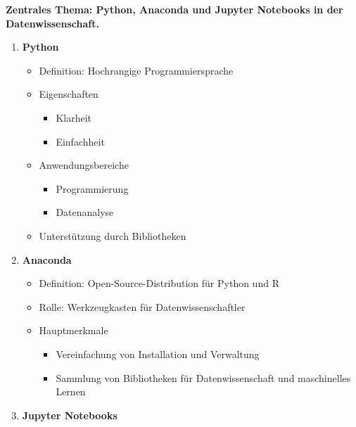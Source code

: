 \documentclass{vorlage-design-main}
\begin{document}
\textbf{Zentrales Thema: Python, Anaconda und Jupyter Notebooks in der
Datenwissenschaft.}

\begin{enumerate}
\def\labelenumi{\arabic{enumi}.}

\item
  \textbf{Python}

  \begin{itemize}
  
  \item
    Definition: Hochrangige Programmiersprache
  \item
    Eigenschaften

    \begin{itemize}
    
    \item
      Klarheit
    \item
      Einfachheit
    \end{itemize}
  \item
    Anwendungsbereiche

    \begin{itemize}
    
    \item
      Programmierung
    \item
      Datenanalyse
    \end{itemize}
  \item
    Unterstützung durch Bibliotheken
  \end{itemize}
\item
  \textbf{Anaconda}

  \begin{itemize}
  
  \item
    Definition: Open-Source-Distribution für Python und R
  \item
    Rolle: Werkzeugkasten für Datenwissenschaftler
  \item
    Hauptmerkmale

    \begin{itemize}
    
    \item
      Vereinfachung von Installation und Verwaltung
    \item
      Sammlung von Bibliotheken für Datenwissenschaft und maschinelles
      Lernen
    \end{itemize}
  \end{itemize}
\item
  \textbf{Jupyter Notebooks}


\end{enumerate}
\end{document}
